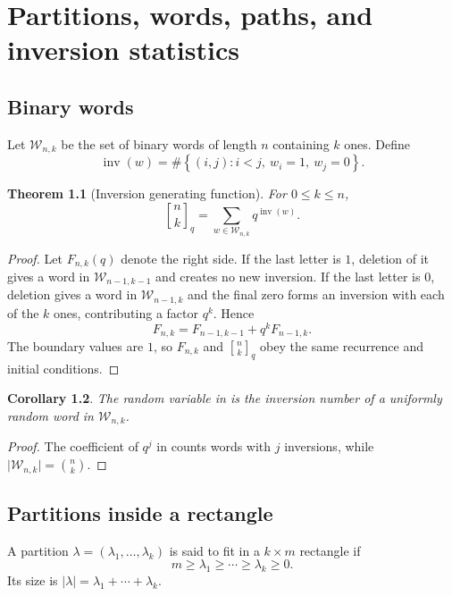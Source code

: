 \documentclass[11pt,oneside,openany]{book}
\newtheorem{theorem}{Theorem}[chapter]
\newtheorem{corollary}[theorem]{Corollary}
\theoremstyle{definition}
\theoremstyle{remark}
\newcommand{\qbinom}[2]{\genfrac{[}{]}{0pt}{}{#1}{#2}_{q}}
\newcommand{\inv}{\operatorname{inv}}
\newcommand{\abs}[1]{\lvert #1\rvert}
\newcommand{\set}[1]{\left\{#1\right\}}
\begin{document}
\chapter{Partitions, words, paths, and inversion statistics}\label{chap:combinatorics}

\section{Binary words}

Let $\mathcal W_{n,k}$ be the set of binary words of length $n$ containing $k$ ones.  Define
\[
 \inv(w)=\#\set{(i,j):i<j,\ w_i=1,\ w_j=0}.
\]

\begin{theorem}[Inversion generating function]\label{thm:binary-inversions}
For $0\le k\le n$,
\[
 \qbinom nk=\sum_{w\in\mathcal W_{n,k}}q^{\inv(w)}.
\]
\end{theorem}

\begin{proof}
Let $F_{n,k}(q)$ denote the right side.  If the last letter is $1$, deletion of it gives a word in $\mathcal W_{n-1,k-1}$ and creates no new inversion.  If the last letter is $0$, deletion gives a word in $\mathcal W_{n-1,k}$ and the final zero forms an inversion with each of the $k$ ones, contributing a factor $q^k$.  Hence
\[
 F_{n,k}=F_{n-1,k-1}+q^kF_{n-1,k}.
\]
The boundary values are $1$, so $F_{n,k}$ and $\qbinom nk$ obey the same recurrence and initial conditions.
\end{proof}

\begin{corollary}
The random variable in  is the inversion number of a uniformly random word in $\mathcal W_{n,k}$.
\end{corollary}

\begin{proof}
The coefficient of $q^j$ in  counts words with $j$ inversions, while $\abs{\mathcal W_{n,k}}=\binom nk$.
\end{proof}

\section{Partitions inside a rectangle}

A partition $\lambda=(\lambda_1,\dots,\lambda_k)$ is said to fit in a $k\times m$ rectangle if
\[
 m\ge\lambda_1\ge\cdots\ge\lambda_k\ge0.
\]
Its size is $\abs\lambda=\lambda_1+\cdots+\lambda_k$.
\end{document}
